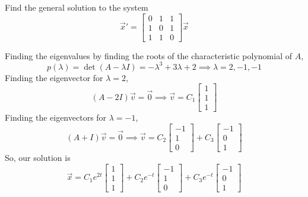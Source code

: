 \begin{example}
	Find the general solution to the system
	\begin{equation*}
		\vec{x}' = \begin{bmatrix}
			0 & 1 & 1 \\
			1 & 0 & 1 \\
			1 & 1 & 0
		\end{bmatrix} \vec{x}
	\end{equation*}
\end{example}
\noindent
Finding the eigenvalues by finding the roots of the characteristic polynomial of $A$,
\begin{equation*}
	p(\lambda) = \det{(A - \lambda I)} = -\lambda^3 + 3\lambda + 2 \implies \lambda = 2, -1, -1
\end{equation*}
Finding the eigenvector for $\lambda = 2$,
\begin{equation*}
	(A - 2I)\vec{v} = \vec{0} \implies \vec{v} = C_1\begin{bmatrix}
		1 \\
		1 \\
		1
	\end{bmatrix}
\end{equation*}
Finding the eigenvectors for $\lambda = -1$,
\begin{equation*}
	(A + I)\vec{v} = \vec{0} \implies \vec{v} = C_2\begin{bmatrix}
		-1 \\
		1 \\
		0
	\end{bmatrix} + C_3\begin{bmatrix}
		-1 \\
		0 \\
		1
	\end{bmatrix}
\end{equation*}
So, our solution is
\begin{equation*}
	\vec{x} = C_1e^{2t}\begin{bmatrix}
		1 \\
		1 \\
		1
	\end{bmatrix} + C_2e^{-t}\begin{bmatrix}
		-1 \\
		1 \\
		0
	\end{bmatrix} + C_3e^{-t}\begin{bmatrix}
		-1 \\
		0 \\
		1
	\end{bmatrix}
\end{equation*}